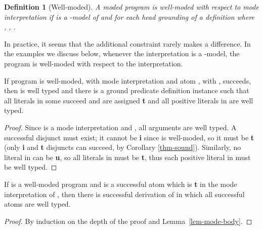 \documentclass{tlp}
\newtheorem{definition}{Definition}
\begin{document}
\begin{definition}[Well-moded] \rm
A moded program  is \emph{well-moded} with respect to
mode interpretation  if 
is a -model of  and for each head grounding of a
definition  where , , .
\end{definition}

\noindent
In practice, it seems that the additional constraint rarely makes a
difference.  In the examples we discuss below, whenever the interpretation
is a -model, the program is well-moded with respect
to the interpretation.

\begin{lemma} \rm
\label{lem-mode-body}
If program  is well-moded, with mode interpretation  and
atom , with , succeeds, then
 is well typed and there is a ground
predicate definition instance 
such that all literals in some  succeed and are
assigned \textbf{t} and all positive literals in  are well typed.
\end{lemma}
\begin{proof}
Since  is a mode interpretation and ,
all arguments are well typed.
A successful disjunct  must exist; it cannot be \textbf{i} since
 is well-moded, so it must be \textbf{t} (only \textbf{i} and
\textbf{t} disjuncts can succeed, by Corollary
\ref{thm-sound}).  Similarly, no literal in  can be \textbf{u}, so
all literals in  must be \textbf{t}, thus each positive literal in
 must be well typed.
\end{proof}

\begin{theorem} \rm
\label{thm-mode-deriv}
If  is a well-moded program
and  is a successful atom which is \textbf{t} in the mode
interpretation of , then there is successful derivation of  in
which all successful atoms are well typed.
\end{theorem}
\begin{proof}
By induction on the depth of the proof and Lemma~\ref{lem-mode-body}.
\end{proof}
\end{document}
